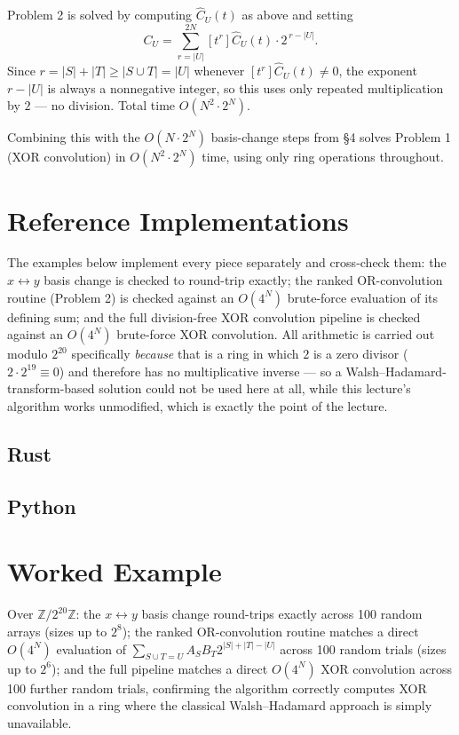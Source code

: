 \documentclass[11pt]{article}
\begin{document}
\begin{theorembox}
Problem 2 is solved by computing $\hat C_U(t)$ as above and setting
\[
  C_U = \sum_{r=|U|}^{2N} [t^r]\hat C_U(t)\cdot 2^{\,r-|U|}.
\]
Since $r=|S|+|T|\ge|S\cup T|=|U|$ whenever $[t^r]\hat C_U(t)\ne0$, the
exponent $r-|U|$ is always a nonnegative integer, so this uses only
repeated multiplication by $2$ --- no division. Total time
$O(N^2\cdot2^N)$.
\end{theorembox}

Combining this with the $O(N\cdot2^N)$ basis-change steps from \S4
solves Problem 1 (XOR convolution) in $O(N^2\cdot2^N)$ time, using only
ring operations throughout.

\section{Reference Implementations}
The examples below implement every piece separately and cross-check
them: the $x\leftrightarrow y$ basis change is checked to round-trip
exactly; the ranked OR-convolution routine (Problem 2) is checked
against an $O(4^N)$ brute-force evaluation of its defining sum; and the
full division-free XOR convolution pipeline is checked against an
$O(4^N)$ brute-force XOR convolution. All arithmetic is carried out
modulo $2^{20}$ specifically \emph{because} that is a ring in which $2$
is a zero divisor ($2\cdot2^{19}\equiv 0$) and therefore has no
multiplicative inverse --- so a Walsh--Hadamard-transform-based solution
could not be used here at all, while this lecture's algorithm works
unmodified, which is exactly the point of the lecture.

\codenote
\subsection{Rust}

\subsection{Python}

\section{Worked Example}
\begin{examplebox}
Over $\mathbb{Z}/2^{20}\mathbb{Z}$: the $x\leftrightarrow y$ basis change
round-trips exactly across 100 random arrays (sizes up to $2^8$); the
ranked OR-convolution routine matches a direct $O(4^N)$ evaluation of
$\sum_{S\cup T=U}A_SB_T2^{|S|+|T|-|U|}$ across 100 random trials (sizes
up to $2^6$); and the full pipeline matches a direct $O(4^N)$ XOR
convolution across 100 further random trials, confirming the algorithm
correctly computes XOR convolution in a ring where the classical
Walsh--Hadamard approach is simply unavailable.
\end{examplebox}
\end{document}
